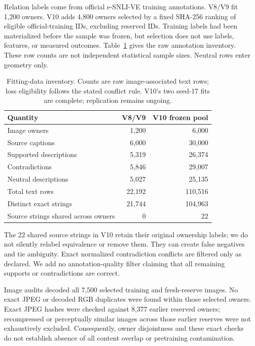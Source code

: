 \documentclass[11pt]{article}
\begin{document}
Relation labels come from official e-SNLI-VE training annotations. V8/V9
fit 1,200 owners. V10 adds 4,800 owners selected by a fixed SHA-256 ranking
of eligible official-training IDs, excluding reserved IDs. Training labels
had been materialized before the sample was frozen, but selection does not
use labels, features, or measured outcomes. Table~\ref{tab:data} gives the
raw annotation inventory. These row counts are not independent statistical
sample sizes. Neutral rows enter geometry only.

\begin{table}[t]
\centering
\caption{Fitting-data inventory. Counts are raw image-associated text rows;
loss eligibility follows the stated conflict rule. V10's two seed-17 fits
are complete; replication remains ongoing.}\label{tab:data}
\begin{tabular}{lrr}
\toprule
Quantity & V8/V9 & V10 frozen pool\\
\midrule
Image owners & 1,200 & 6,000\\
Source captions & 6,000 & 30,000\\
Supported descriptions & 5,319 & 26,374\\
Contradictions & 5,846 & 29,007\\
Neutral descriptions & 5,027 & 25,135\\
Total text rows & 22,192 & 110,516\\
Distinct exact strings & 21,744 & 104,963\\
Source strings shared across owners & 0 & 22\\
\bottomrule
\end{tabular}
\end{table}

The 22 shared source strings in V10 retain their original ownership labels;
we do not silently relabel equivalence or remove them. They can create
false negatives and tie ambiguity. Exact normalized contradiction conflicts
are filtered only as declared. We add no annotation-quality filter claiming
that all remaining supports or contradictions are correct.

Image audits decoded all 7,500 selected training and fresh-reserve images.
No exact JPEG or decoded RGB duplicates were found within those selected
owners. Exact JPEG hashes were checked against 8,377 earlier reserved
owners; recompressed or perceptually similar images across those earlier
reserves were not exhaustively excluded. Consequently, owner disjointness
and these exact checks do not establish absence of all content overlap or
pretraining contamination.
\end{document}
